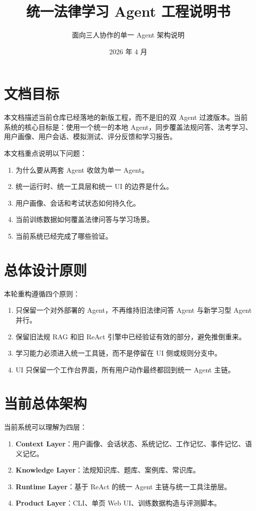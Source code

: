 \documentclass[12pt]{ctexart}
\title{统一法律学习 Agent 工程说明书}
\author{面向三人协作的单一 Agent 架构说明}
\date{2026 年 4 月}
\begin{document}
\maketitle

\section{文档目标}

本文档描述当前仓库已经落地的新版工程，而不是旧的双 Agent 过渡版本。当前系统的核心目标是：使用一个统一的本地 Agent，同步覆盖法规问答、法考学习、用户画像、用户会话、模拟测试、评分反馈和学习报告。

本文档重点说明以下问题：

\begin{enumerate}
  \item 为什么要从两套 Agent 收敛为单一 Agent。
  \item 统一运行时、统一工具层和统一 UI 的边界是什么。
  \item 用户画像、会话和考试状态如何持久化。
  \item 当前训练数据如何覆盖法律问答与学习场景。
  \item 当前系统已经完成了哪些验证。
\end{enumerate}

\section{总体设计原则}

本轮重构遵循四个原则：

\begin{enumerate}
  \item 只保留一个对外部署的 Agent，不再维持旧法律问答 Agent 与新学习型 Agent 并行。
  \item 保留旧法规 RAG 和旧 ReAct 引擎中已经验证有效的部分，避免推倒重来。
  \item 学习能力必须进入统一工具链，而不是停留在 UI 侧或规则分支中。
  \item UI 只保留一个工作台界面，所有用户动作最终都回到统一 Agent 主链。
\end{enumerate}

\section{当前总体架构}

当前系统可以理解为四层：

\begin{enumerate}
  \item \textbf{Context Layer}：用户画像、会话状态、系统记忆、工作记忆、事件记忆、语义记忆。
  \item \textbf{Knowledge Layer}：法规知识库、题库、案例库、常识库。
  \item \textbf{Runtime Layer}：基于 ReAct 的统一 Agent 主链与统一工具注册层。
  \item \textbf{Product Layer}：CLI、单页 Web UI、训练数据构造与评测脚本。
\end{enumerate}
\end{document}
